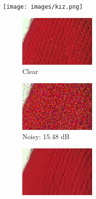  \begin{figure}[t!]
    \texttt{[image: images/kız.png]}
    \centering %
    \begin{subfigure}{0.28\textwidth}
      \includegraphics[width=\linewidth]{images/kodak_gt.png}
      \caption{Clear}
      \label{fig:kodak_clear}
    \end{subfigure}\hfil %
    \begin{subfigure}{0.28\textwidth}
      \includegraphics[width=\linewidth]{images/kodak_noisy.png}
      \caption{Noisy: 15.48 dB}
      \label{fig:kodak_noisy}
    \end{subfigure}\hfil %
    \begin{subfigure}{0.28\textwidth}
      \includegraphics[width=\linewidth]{images/kodak_out.png}

\end{subfigure}
\end{figure}
